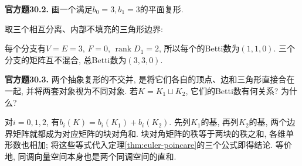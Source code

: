 \begin{exercise}\label{cq:30.2}
\textbf{官方题30.2.} 画一个满足$b_0=3,b_1=3$的平面复形.
\end{exercise}
\begin{solution}
取三个相互分离、内部不填充的三角形边界:
\begin{center}
\end{center}
每个分支有$V=E=3$, $F=0$, $\operatorname{rank}D_1=2$, 所以每个的Betti数为$(1,1,0)$. 三个分支的矩阵互不混合, 总Betti数为$(3,3,0)$.
\end{solution}

\begin{exercise}\label{cq:30.3}
\textbf{官方题30.3.} 两个抽象复形的不交并, 是将它们各自的顶点、边和三角形直接合在一起, 并将两套对象视为不同对象. 若$K=K_1\sqcup K_2$, 它们的Betti数有何关系? 为什么?
\end{exercise}
\begin{solution}
对$i=0,1,2$, 有$b_i(K)=b_i(K_1)+b_i(K_2)$. 先列$K_1$的基, 再列$K_2$的基, 两个边界矩阵就都成为对应矩阵的块对角和. 块对角矩阵的秩等于两块的秩之和, 各维单形数也相加; 将这些等式代入定理\ref{thm:euler-poincare}的三个公式即得结论. 等价地, 同调向量空间本身也是两个同调空间的直和.
\end{solution}

